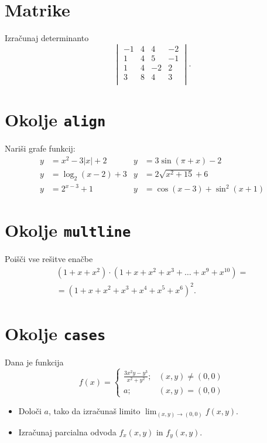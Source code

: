 \documentclass[a4paper,12pt]{article}
\begin{document}
\section*{Matrike}
Izračunaj determinanto
\[
\begin{vmatrix}
   -1 & 4 & 4 & -2 \\
   1 & 4 & 5 & -1 \\
   1 & 4 & -2 & 2 \\
   3 & 8 & 4 & 3 \\
\end{vmatrix}.
\]

\section*{Okolje \texttt{align}}
Nariši grafe funkcij:
\begin{align*}
y &= x^2 - 3|x| + 2 & y &= 3\sin(\pi+x) - 2 \\
y &= \log_2(x-2) + 3 & y &= 2\sqrt{x^2+15} + 6 \\
y &= 2^{x-3} + 1 & y &= \cos(x-3) + \sin^2(x+1)
\end{align*}

\section*{Okolje \texttt{multline}}
Poišči vse rešitve enačbe
\begin{multline*}
(1+x+x^2) \cdot (1+x+x^2+x^3+\ldots+x^9+x^{10}) = \\
=(1+x+x^2+x^3+x^4+x^5+x^6)^2.
\end{multline*}

\section*{Okolje \texttt{cases}}
Dana je funkcija
\[
f(x) = 
\begin{cases}
\frac{3x^2y-y^3}{x^2+y^2}; & (x,y) \neq (0,0) \\
a; & (x,y) = (0,0)
\end{cases}
 \]
 
\begin{itemize}
\item Določi \(a\), tako da izračunaš limito \( \lim_{(x,y)\to(0,0)} f(x,y) \).
\item Izračunaj parcialna odvoda \(f_x(x,y)\) in \(f_y(x,y)\).
\end{itemize}
\end{document}

